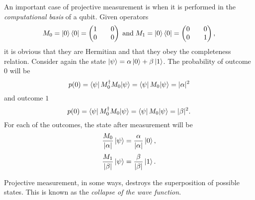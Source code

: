 \documentclass[../../../dissertation.tex]{subfiles}
\begin{document}
An important case of projective measurement is when it is performed in the
\textit{computational basis} of a qubit. Given operators 
\begin{equation}
	M_0 = \ket{0}\bra{0} = \begin{pmatrix}
				1 && 0\\
				0 && 0
				\end{pmatrix}
	\;
	\text{and}
	\;
	M_1 = \ket{0}\bra{0} = \begin{pmatrix}
				0 && 0\\
				0 && 1
				\end{pmatrix},
\end{equation}
it is obvious that they are Hermitian and that they obey the completeness
relation. Consider again the state $\ket{\psi}=\alpha\ket{0} + \beta\ket{1}$.
The probability of outcome $0$ will be 
\begin{equation}
	p(0) = \bra{\psi}M_0^\dag M_0{\ket{\psi}} = \bra{\psi}M_0{\ket{\psi}} = |\alpha|^2
\end{equation}
and outcome $1$
\begin{equation}
	p(0) = \bra{\psi}M_0^\dag M_0{\ket{\psi}} = \bra{\psi}M_0{\ket{\psi}} = |\beta|^2.
\end{equation}
For each of the outcomes, the state after measurement will be
\begin{equation} 
	\frac{M_0}{|\alpha|} \ket{\psi} = \frac{\alpha}{|\alpha|} \ket{0},
\end{equation}
\begin{equation} 
	\frac{M_1}{|\beta|} \ket{\psi} = \frac{\beta}{|\beta|} \ket{1}.
\end{equation}\par
Projective measurement, in some ways, destroys the superposition of possible
states. This is known as the \textit{collapse of the wave function}. 
\end{document}
